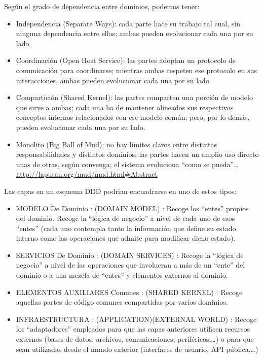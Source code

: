 \documentclass[spanish,12pt,a4paper,final,oneside]{book}
\begin{document}
Según el grado de dependencia entre dominios, podemos tener:
\begin{itemize}

\item Independencia (Separate Ways): cada parte hace su trabajo tal cual, sin ninguna dependencia entre ellas; ambas pueden evolucionar cada una por su lado.

\item Coordinación (Open Host Service): las partes adoptan un protocolo de comunicación para coordinarse; mientras ambas respeten ese protocolo en sus interacciones, ambas pueden evolucionar cada una por su lado.

\item Compartición (Shared Kernel): las partes comparten una porción de modelo que sirve a ambas; cada una ha de mantener alineados sus respectivos conceptos internos relacionados con ese modelo común; pero, por lo demás, pueden evolucionar cada una por su lado.

\item Monolito (Big Ball of Mud):  no hay límites claros entre distintas responsabilidades y distintos dominios; las partes hacen un amplio uso directo unas de otras, según convenga; el sistema evoluciona ``como se pueda''\ldots
\\ {\footnotesize \url{http://laputan.org/mud/mud.html#Abstract}}

\end{itemize}


Las capas en un esquema DDD podrian encuadrarse en uno de estos tipos:
\begin{itemize}
\item MODELO De Dominio : (DOMAIN MODEL) : Recoge los ``entes'' propios del dominio. Recoge la ``lógica de negocio'' a nivel de cada uno de esos ``entes'' (cada uno contempla tanto la información que define su estado interno como las operaciones que admite para modificar dicho estado).
\item SERVICIOS De Dominio : (DOMAIN SERVICES) : Recoge la ``lógica de negocio'' a nivel de las operaciones que involucran a más de un ``ente'' del dominio o a una mezcla de ``entes'' y elementos externos al dominio.
\item ELEMENTOS AUXILIARES Comunes : (SHARED KERNEL) : Recoge aquellas partes de código comunes compartidas por varios dominios.
\item INFRAESTRUCTURA : (APPLICATION)(EXTERNAL WORLD) : Recoge los ``adaptadores'' empleados para que las  capas anteriores utilicen recursos externos (bases de datos, archivos, comunicaciones, periféricos,\ldots) o para que sean utilizadas desde el mundo exterior (interfaces de usuario, API pública,\ldots)
\end{itemize}
\end{document}
